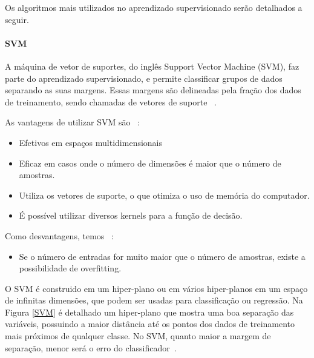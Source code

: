 

      Os algoritmos mais utilizados no aprendizado supervisionado serão detalhados a seguir.

      \paragraph{SVM}
      \label{par:svm}

        A máquina de vetor de suportes, do inglês Support Vector Machine (\acrshort{SVM}), faz parte do aprendizado supervisionado, e permite
        classificar grupos de dados separando as suas margens. Essas margens são delineadas pela fração dos dados de treinamento, sendo chamadas de vetores de suporte ~\cite{chang2011libsvm}.

        As vantagens de utilizar \acrshort{SVM} são ~\cite{pedregosa2011scikit}:

        \begin{itemize}

          \item Efetivos em espaços multidimensionais
          \item Eficaz em casos onde o número de dimensões é maior que o número de amostras.
          \item Utiliza os vetores de suporte, o que otimiza o uso de memória do computador.
          \item É possível utilizar diversos kernels para a função de decisão.

        \end{itemize}

        Como desvantagens, temos ~\cite{pedregosa2011scikit}:

        \begin{itemize}

          \item Se o número de entradas for muito maior que o número de amostras, existe a possibilidade de overfitting.

        \end{itemize}
        
        O \acrshort{SVM} é construido em um hiper-plano ou em vários hiper-planos em um espaço de infinitas dimensões, que podem ser
        usadas para classificação ou regressão. Na Figura \ref{SVM} é detalhado um hiper-plano que mostra uma boa separação das variáveis, possuindo a maior distância 
        até os pontos dos dados de treinamento mais próximos de qualquer classe. No \acrshort{SVM}, quanto maior a margem de separação, 
        menor será o erro do classificador~\cite{vieira2017plantrna_sniffer}. 
        
